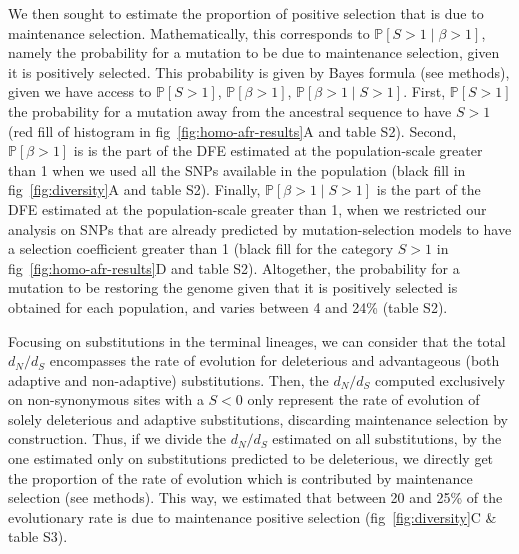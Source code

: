 \documentclass{article}
\newcommand{\dn}{d_N}
\newcommand{\ds}{d_S}
\newcommand{\dnds}{\dn / \ds}
\newcommand{\Sphy}{S}
\newcommand{\given}{\mid}
\newcommand{\Spop}{\beta}
\begin{document}
    We then sought to estimate the proportion of positive selection that is due to maintenance selection.
    Mathematically, this corresponds to $\mathbb{P} [ \Sphy > 1  \given  \Spop > 1]$, namely the probability for a mutation to be due to maintenance selection, given it is positively selected.
    This probability is given by Bayes formula (see methods), given we have access to $\mathbb{P} [ \Sphy > 1 ]$, $\mathbb{P} [ \Spop > 1 ]$, $\mathbb{P} [ \Spop > 1  \given  \Sphy > 1]$.
    First, $\mathbb{P} [ \Sphy > 1 ]$ the probability for a mutation away from the ancestral sequence to have $\Sphy > 1$ (red fill of histogram in fig~\ref{fig:homo-afr-results}A and table S2).
    Second, $\mathbb{P} [ \Spop > 1 ]$ is is the part of the DFE estimated at the population-scale greater than 1 when we used all the SNPs available in the population (black fill in fig~\ref{fig:diversity}A and table S2).
    Finally, $\mathbb{P} [ \Spop > 1  \given  \Sphy > 1]$ is the part of the DFE estimated at the population-scale greater than 1, when we restricted our analysis on SNPs that are already predicted by mutation-selection models to have a selection coefficient greater than 1 (black fill for the category $\Sphy > 1$ in fig~\ref{fig:homo-afr-results}D and table S2).
    Altogether, the probability for a mutation to be restoring the genome given that it is positively selected is obtained for each population, and varies between 4 and 24\% (table S2).

    Focusing on substitutions in the terminal lineages, we can consider that the total $\dnds$ encompasses the rate of evolution for deleterious and advantageous (both adaptive and non-adaptive) substitutions.
    Then, the $\dnds$ computed exclusively on non-synonymous sites with a $\Sphy < 0$ only represent the rate of evolution of solely deleterious and adaptive substitutions, discarding maintenance selection by construction.
    Thus, if we divide the $\dnds$ estimated on all substitutions, by the one estimated only on substitutions predicted to be deleterious, we directly get the proportion of the rate of evolution which is contributed by maintenance selection (see methods).
    This way, we estimated that between 20 and 25\% of the evolutionary rate is due to maintenance positive selection (fig~\ref{fig:diversity}C \& table S3).
\end{document}
